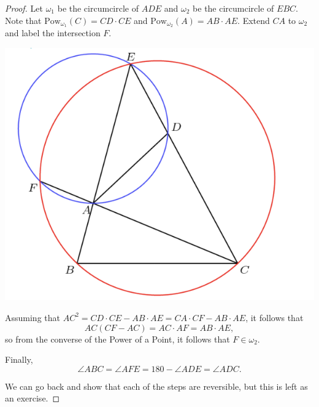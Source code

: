 \documentclass[12pt]{scrartcl}
\newcommand{\<}{\langle}
\renewcommand{\>}{\rangle}
\begin{document}
\begin{proof}
Let $\omega_1$ be the circumcircle of $ADE$ and $\omega_2$ be the circumcircle of $EBC$.  Note that $\text{Pow}_{\omega_1}(C) = CD \cdot CE$ and $\text{Pow}_{\omega_2}(A) = AB \cdot AE$.  Extend $CA$ to $\omega_2$ and label the intersection $F$.  
\begin{center}
\includegraphics[scale=0.7]{graphics/p2-4.png}
\end{center}
Assuming that $AC^2 = CD \cdot CE - AB \cdot AE = CA \cdot CF - AB \cdot AE$, it follows that 
$$AC(CF - AC) = AC \cdot AF = AB \cdot AE,$$
so from the converse of the Power of a Point, it follows that $F \in \omega_2$.

Finally,
$$\angle ABC = \angle AFE = 180 - \angle ADE = \angle ADC.$$

We can go back and show that each of the steps are reversible, but this is left as an exercise.
\end{proof}
\end{document}
